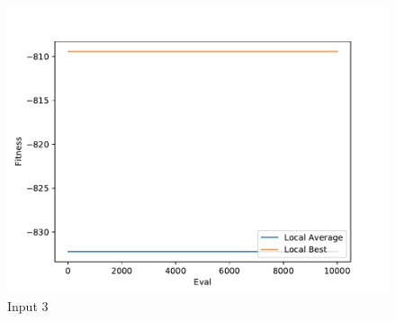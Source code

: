\documentclass{standalone}
\begin{document}
\begin{figure}[!htb]
	\caption{Input 3}
	\label{fig:graph_3047}
	\includegraphics[width=\textwidth]{../graphs/graphs/3047.pdf}
\end{figure}
\end{document}
